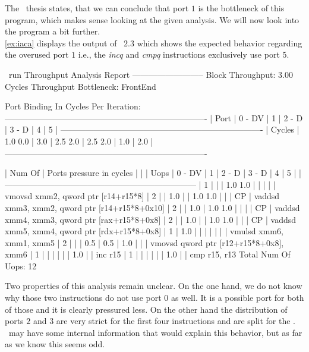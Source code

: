 The \osaca\ thesis states, that we can conclude that port $1$ is the bottleneck of this program, which makes sense looking at the given analysis. We will now look into the program a bit further.\\
\autoref{ex:iaca} displays the output of \iaca\ $2.3$ which shows the expected behavior regarding the overused port $1$ i.e., the \emph{incq} and \emph{cmpq} instructions exclusively use port $5$.

\begin{LabeledExample}{\iaca\ run}{\label{ex:iaca}}
  Throughput Analysis Report
  --------------------------
  Block Throughput: 3.00 Cycles       Throughput Bottleneck: FrontEnd
  
  Port Binding In Cycles Per Iteration:
  -------------------------------------------------------------------------
  |  Port  |  0   -  DV  |  1   |  2   -  D   |  3   -  D   |  4   |  5   |
  -------------------------------------------------------------------------
  | Cycles | 1.0    0.0  | 3.0  | 2.5    2.0  | 2.5    2.0  | 1.0  | 2.0  |
  -------------------------------------------------------------------------
  
      
  | Num Of |              Ports pressure in cycles               |    |
  |  Uops  |  0  - DV  |  1  |  2  -  D  |  3  -  D  |  4  |  5  |    |
  ---------------------------------------------------------------------
  |   1    |           |     | 1.0   1.0 |           |     |     |    | vmovsd xmm2, qword ptr [r14+r15*8]
  |   2    |           | 1.0 |           | 1.0   1.0 |     |     | CP | vaddsd xmm3, xmm2, qword ptr [r14+r15*8+0x10]
  |   2    |           | 1.0 | 1.0   1.0 |           |     |     | CP | vaddsd xmm4, xmm3, qword ptr [rax+r15*8+0x8]
  |   2    |           | 1.0 |           | 1.0   1.0 |     |     | CP | vaddsd xmm5, xmm4, qword ptr [rdx+r15*8+0x8]
  |   1    | 1.0       |     |           |           |     |     |    | vmulsd xmm6, xmm1, xmm5
  |   2    |           |     | 0.5       | 0.5       | 1.0 |     |    | vmovsd qword ptr [r12+r15*8+0x8], xmm6
  |   1    |           |     |           |           |     | 1.0 |    | inc r15
  |   1    |           |     |           |           |     | 1.0 |    | cmp r15, r13
  Total Num Of Uops: 12
\end{LabeledExample}

Two properties of this analysis remain unclear. On the one hand, we do not know why those two instructions do not use port $0$ as well. It is a possible port for both of those and it is clearly pressured less. On the other hand the distribution of ports $2$ and $3$ are very strict for the first four instructions and are split for the . \iaca\ may have some internal information that would explain this behavior, but as far as we know this seems odd.\\

